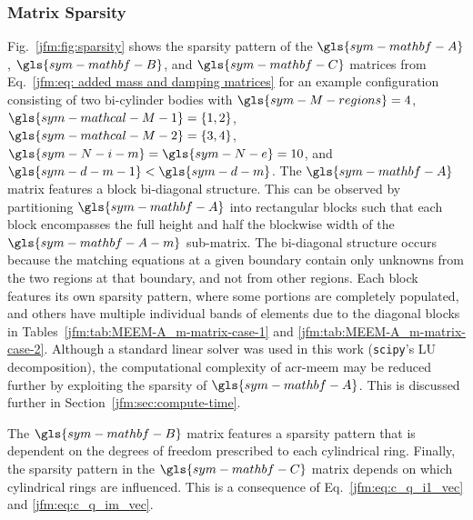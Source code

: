 \documentclass[ASNA,twocolumn]{USG} %
\begin{document}
\subsubsection{Matrix Sparsity}
Fig.~\ref{jfm:fig:sparsity} shows the sparsity pattern of the $\gls{sym-mathbf-A}$, $\gls{sym-mathbf-B}$, and $\gls{sym-mathbf-C}$ matrices from Eq.~\ref{jfm:eq: added mass and damping matrices} for an example configuration consisting of two bi-cylinder bodies with $\gls{sym-M-regions}=4$, $\gls{sym-mathcal-M-1} = \{1, 2\}$, $\gls{sym-mathcal-M-2} = \{3, 4\}$, $\gls{sym-N-i-m}=\gls{sym-N-e}=10$, and $\gls{sym-d-m-1}<\gls{sym-d-m}$. 
The $\gls{sym-mathbf-A}$ matrix features a block bi-diagonal structure.
This can be observed by partitioning $\gls{sym-mathbf-A}$ into rectangular blocks such that each block encompasses the full height and half the blockwise width of the $\gls{sym-mathbf-A-m}$ sub-matrix.
The bi-diagonal structure occurs because the matching equations at a given boundary contain only unknowns from the two regions at that boundary, and not from other regions.
Each block features its own sparsity pattern, where some portions are completely populated, 
and others have multiple individual bands of elements due to the diagonal blocks in Tables~\ref{jfm:tab:MEEM-A_m-matrix-case-1} and \ref{jfm:tab:MEEM-A_m-matrix-case-2}. 
Although a standard linear solver was used in this work (\texttt{scipy}'s LU decomposition), 
the computational complexity of \gls{acr-meem} may be reduced further by exploiting the sparsity of $\gls{sym-mathbf-A}$. 
This is discussed further in Section~\ref{jfm:sec:compute-time}.

The $\gls{sym-mathbf-B}$ matrix features a sparsity pattern that is dependent on the degrees of freedom prescribed to each cylindrical ring. 
Finally, the sparsity pattern in the $\gls{sym-mathbf-C}$ matrix depends on which cylindrical rings are influenced. 
This is a consequence of Eq.~\ref{jfm:eq:c_q_i1_vec} and \ref{jfm:eq:c_q_im_vec}.
\end{document}
